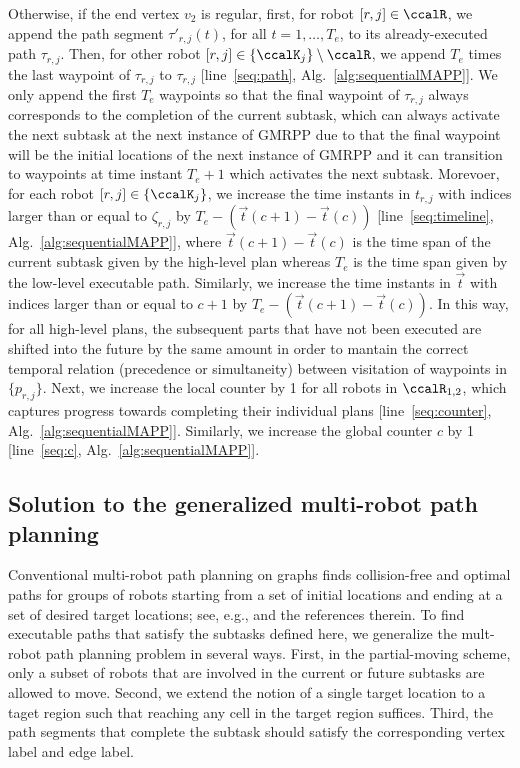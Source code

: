 \documentclass[Afour,sageh,times]{sagej}
\begin{document}
{{{Otherwise, if the end vertex $v_2$ is regular, first, for robot $[r, j] \in \ccalR$, we append the path segment $\tau'_{r,j}(t)$, for all $t=1,\ldots, T_e$, to its already-executed path $\tau_{r,j}$. Then, for other robot $[r,j] \in \{\ccalK_j\}\setminus \ccalR$, we  append  $T_e$ times the last waypoint of  $\tau_{r,j}$  to $\tau_{r,j}$ [line~\ref{seq:path}, Alg.~\ref{alg:sequentialMAPP}]. We only append the first $T_e$ waypoints so that the final waypoint of $\tau_{r,j}$ always corresponds to the completion of the current  subtask, which can always activate the next subtask at the next instance of GMRPP due to that the final waypoint will be the initial locations of the next instance of GMRPP and it  can transition to waypoints at time instant $T_e+1$ which activates the next subtask.  Morevoer, for each robot $[r,j] \in \{\ccalK_j\}$, we increase the time instants in $t_{r,j}$ with indices larger than or equal to  $\zeta_{r,j}$ by $T_e - (\vec{t}(c+1) - \vec{t}(c))$ [line~\ref{seq:timeline}, Alg.~\ref{alg:sequentialMAPP}], where $\vec{t}(c+1) - \vec{t}(c)$ is the time span of the current subtask  given by the high-level plan whereas $T_e$ is the time span given by the low-level executable path.
    Similarly, we increase the time instants in $\vec{t}$ with indices larger than or equal to  $c+1$ by $T_e - (\vec{t}(c+1)- \vec{t}(c))$.
    In this way, for all high-level plans, the subsequent parts that have not been executed are shifted into the future by the same amount in order to mantain the correct temporal relation (precedence or simultaneity) between visitation of waypoints in $\{p_{r,j}\}$. Next, we increase  the local counter by 1 for all robots in $\ccalR_{1,2}$, which captures progress towards completing their individual plans [line~\ref{seq:counter}, Alg.~\ref{alg:sequentialMAPP}]. Similarly, we increase the global counter $c$ by 1 [line~\ref{seq:c}, Alg.~\ref{alg:sequentialMAPP}].}

\subsection{Solution to the generalized multi-robot path planning}\label{sec:solution2mapp}

{ Conventional multi-robot path planning on graphs finds collision-free and optimal paths for groups of robots starting from a set of initial locations and ending at a set of desired target locations; see, e.g., \cite{yu2016optimal} and the references therein. To find executable paths that satisfy the subtasks defined here, we generalize the mult-robot path planning problem in several ways. First, in the partial-moving scheme,  only a subset of robots that are involved in the current or future subtasks are allowed to move.  Second, we extend the notion of a single target location to a taget region such that reaching any cell in the target region suffices. Third, the path segments that complete the  subtask should satisfy the corresponding vertex label and edge label.


}}}
\end{document}
